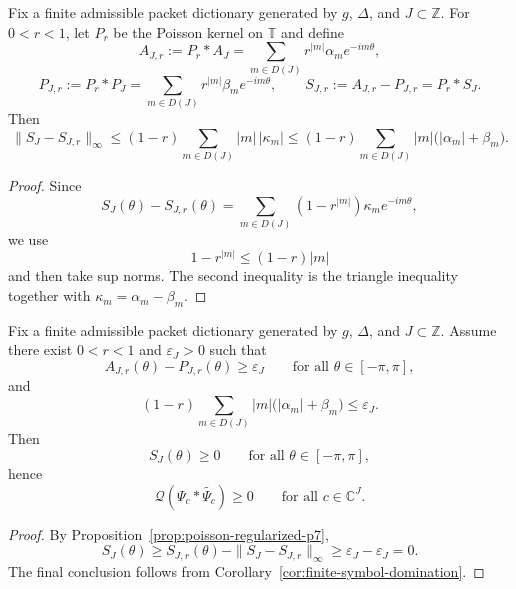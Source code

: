 \begin{proposition}\label{prop:poisson-regularized-p7}
Fix a finite admissible packet dictionary generated by $g$, $\Delta$, and
$J\subset\mathbb Z$. For $0<r<1$, let $P_r$ be the Poisson kernel on $\mathbb T$
and define
\[
  A_{J,r}:=P_r*A_J
  =
  \sum_{m\in D(J)} r^{|m|}\alpha_m e^{-im\theta},
\]
\[
  P_{J,r}:=P_r*P_J
  =
  \sum_{m\in D(J)} r^{|m|}\beta_m e^{-im\theta},
  \qquad
  S_{J,r}:=A_{J,r}-P_{J,r}=P_r*S_J.
\]
Then
\[
  \|S_J-S_{J,r}\|_\infty
  \le
  (1-r)\sum_{m\in D(J)} |m|\,|\kappa_m|
  \le
  (1-r)\sum_{m\in D(J)} |m|\bigl(|\alpha_m|+\beta_m\bigr).
\]
\end{proposition}

\begin{proof}
Since
\[
  S_J(\theta)-S_{J,r}(\theta)
  =
  \sum_{m\in D(J)}(1-r^{|m|})\kappa_m e^{-im\theta},
\]
we use
\[
  1-r^{|m|}\le (1-r)|m|
\]
and then take sup norms. The second inequality is the triangle inequality
together with $\kappa_m=\alpha_m-\beta_m$.
\end{proof}

\begin{corollary}\label{cor:regularized-p7}
Fix a finite admissible packet dictionary generated by $g$, $\Delta$, and
$J\subset\mathbb Z$. Assume there exist $0<r<1$ and $\varepsilon_J>0$ such that
\[
  A_{J,r}(\theta)-P_{J,r}(\theta)\ge \varepsilon_J
  \qquad\text{for all }\theta\in[-\pi,\pi],
\]
and
\[
  (1-r)\sum_{m\in D(J)} |m|\bigl(|\alpha_m|+\beta_m\bigr)\le \varepsilon_J.
\]
Then
\[
  S_J(\theta)\ge0
  \qquad\text{for all }\theta\in[-\pi,\pi],
\]
hence
\[
  \mathcal Q(\Psi_c*\widetilde{\Psi_c})\ge0
  \qquad\text{for all }c\in\mathbb C^J.
\]
\end{corollary}

\begin{proof}
By Proposition~\ref{prop:poisson-regularized-p7},
\[
  S_J(\theta)
  \ge
  S_{J,r}(\theta)-\|S_J-S_{J,r}\|_\infty
  \ge
  \varepsilon_J-\varepsilon_J
  =0.
\]
The final conclusion follows from Corollary~\ref{cor:finite-symbol-domination}.
\end{proof}

